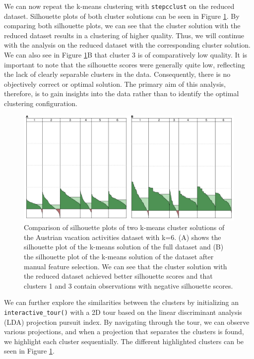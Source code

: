 \documentclass[article]{ajs}
\begin{document}
We can now repeat the k-means clustering with \texttt{stepcclust} on the reduced dataset. Silhouette plots of both cluster solutions can be seen in Figure \ref{fig:silhouette_comparison}. By comparing both silhouette plots, we can see that the cluster solution with the reduced dataset results in a clustering of higher quality. Thus, we will continue with the analysis on the reduced dataset with the corresponding cluster solution. We can also see in Figure \ref{fig:silhouette_comparison}B that cluster 3 is of comparatively low quality. It is important to note that the silhouette scores were generally quite low, reflecting the lack of clearly separable clusters in the data. Consequently, there is no objectively correct or optimal solution. The primary aim of this analysis, therefore, is to gain insights into the data rather than to identify the optimal clustering configuration.

\begin{figure}[h!]
    \centering
    \includegraphics[width=1\textwidth]{silhouette_comparison.png}
    \caption{Comparison of silhouette plots of two k-means cluster solutions of the Austrian vacation activities dataset with k=6. (A) shows the silhouette plot of the k-means solution of the full dataset and (B) the silhouette plot of the k-means solution of the dataset after manual feature selection. We can see that the cluster solution with the reduced dataset achieved better silhouette scores and that clusters 1 and 3 contain observations with negative silhouette scores.}
    \label{fig:silhouette_comparison}
\end{figure}

We can further explore the similarities between the clusters by initializing an \texttt{interactive\_tour()} with a 2D tour based on the linear discriminant analysis (LDA) projection pursuit index. By navigating through the tour, we can observe various projections, and when a projection that separates the clusters is found, we highlight each cluster sequentially. The different highlighted clusters can be seen in Figure \ref{fig:silhouette_comparison}.
\end{document}
